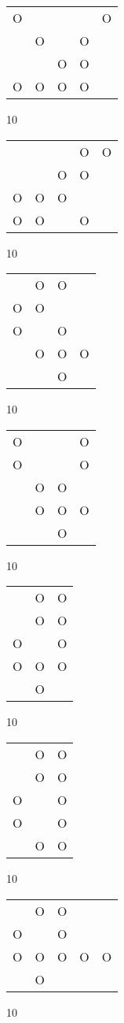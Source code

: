 \begin{tabular}{|m{0.2cm}m{0.2cm}m{0.2cm}m{0.2cm}m{0.2cm}|}\hline
O& & & &O\\
 &O& &O& \\
 & &O&O& \\
O&O&O&O& \\
\hline\end{tabular}10
\begin{tabular}{|m{0.2cm}m{0.2cm}m{0.2cm}m{0.2cm}m{0.2cm}|}\hline
 & & &O&O\\
 & &O&O& \\
O&O&O& & \\
O&O& &O& \\
\hline\end{tabular}10
\begin{tabular}{|m{0.2cm}m{0.2cm}m{0.2cm}m{0.2cm}|}\hline
 &O&O& \\
O&O& & \\
O& &O& \\
 &O&O&O\\
 & &O& \\
\hline\end{tabular}10
\begin{tabular}{|m{0.2cm}m{0.2cm}m{0.2cm}m{0.2cm}|}\hline
O& & &O\\
O& & &O\\
 &O&O& \\
 &O&O&O\\
 & &O& \\
\hline\end{tabular}10
\begin{tabular}{|m{0.2cm}m{0.2cm}m{0.2cm}|}\hline
 &O&O\\
 &O&O\\
O& &O\\
O&O&O\\
 &O& \\
\hline\end{tabular}10
\begin{tabular}{|m{0.2cm}m{0.2cm}m{0.2cm}|}\hline
 &O&O\\
 &O&O\\
O& &O\\
O& &O\\
 &O&O\\
\hline\end{tabular}10
\begin{tabular}{|m{0.2cm}m{0.2cm}m{0.2cm}m{0.2cm}m{0.2cm}|}\hline
 &O&O& & \\
O& &O& & \\
O&O&O&O&O\\
 &O& & & \\
\hline\end{tabular}10
